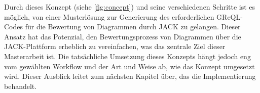 Durch dieses Konzept (siehe \ref{fig:concept}) und seine verschiedenen Schritte ist es möglich, von einer Musterlösung zur Generierung des erforderlichen GReQL-Codes für die Bewertung von Diagrammen durch JACK zu gelangen. Dieser Ansatz hat das Potenzial, den Bewertungsprozess von Diagrammen über die JACK-Plattform erheblich zu vereinfachen, was das zentrale Ziel dieser Masterarbeit ist. Die tatsächliche Umsetzung dieses Konzepts hängt jedoch eng vom gewählten Workflow und der Art und Weise ab, wie das Konzept umgesetzt wird. Dieser Ausblick leitet zum nächsten Kapitel über, das die Implementierung behandelt.